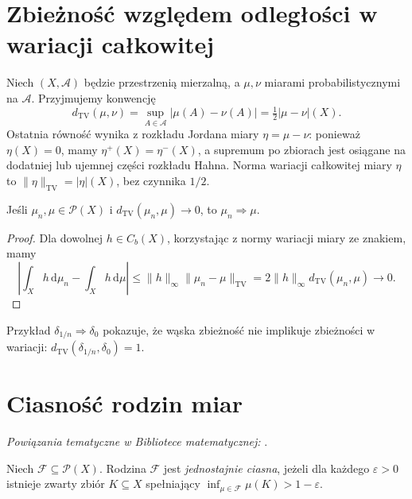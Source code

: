 \section{Zbieżność względem odległości w wariacji całkowitej}
\begin{definicja}
\label{def:tv-distance-22}
Niech $(X,\mathcal A)$ będzie przestrzenią mierzalną,
a $\mu,\nu$ miarami probabilistycznymi na $\mathcal A$.
Przyjmujemy konwencję
\[
 d_{\mathrm{TV}}(\mu,\nu)
 =\sup_{A\in\mathcal A}|\mu(A)-\nu(A)|
 =\tfrac12|\mu-\nu|(X).
\]
Ostatnia równość wynika z rozkładu Jordana miary
$\eta=\mu-\nu$: ponieważ $\eta(X)=0$, mamy
$\eta^+(X)=\eta^-(X)$, a supremum po zbiorach
jest osiągane na dodatniej lub ujemnej części rozkładu
Hahna. Norma wariacji całkowitej miary $\eta$ to
$\|\eta\|_{\mathrm{TV}}=|\eta|(X)$, bez czynnika $1/2$.
\end{definicja}
\begin{twierdzenie}
\label{thm:tv-implies-narrow-22}
Jeśli $\mu_n,\mu\in\mathcal P(X)$ i
$d_{\mathrm{TV}}(\mu_n,\mu)\to0$, to
$\mu_n\Rightarrow\mu$.
\end{twierdzenie}
\begin{proof}
Dla dowolnej $h\in C_b(X)$, korzystając z normy
wariacji miary ze znakiem, mamy
\[
\left|\int_Xh\,\mathrm d\mu_n-\int_Xh\,\mathrm d\mu\right|
\le \|h\|_\infty\|\mu_n-\mu\|_{\mathrm{TV}}
=2\|h\|_\infty d_{\mathrm{TV}}(\mu_n,\mu)\to0.
\]
\end{proof}

\begin{uwaga}
Przykład $\delta_{1/n}\Rightarrow\delta_0$ pokazuje,
że wąska zbieżność nie implikuje zbieżności w wariacji:
$d_{\mathrm{TV}}(\delta_{1/n},\delta_0)=1$.
\end{uwaga}

\section{Ciasność rodzin miar}

\noindent\emph{Powiązania tematyczne w Bibliotece matematycznej:} .

\begin{definicja}
\label{def:uniform-tight-22}
Niech $\mathcal F\subseteq\mathcal P(X)$.
Rodzina $\mathcal F$ jest \emph{jednostajnie ciasna},
jeżeli dla każdego $\varepsilon>0$ istnieje
zwarty zbiór $K\subseteq X$ spełniający
$\inf_{\mu\in\mathcal F}\mu(K)>1-\varepsilon$.
\end{definicja}


